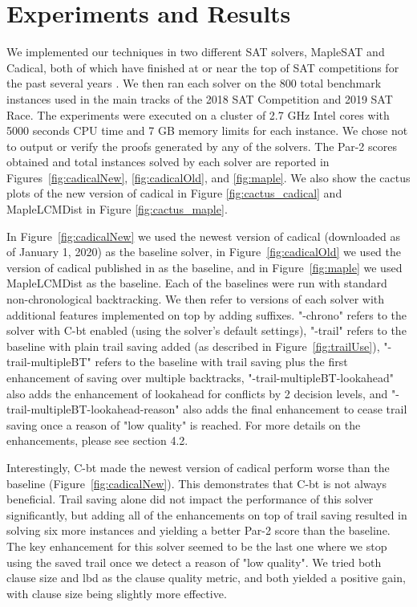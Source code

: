 \documentclass[runningheads]{llncs}
\newcommand{\cbt}{C-bt\xspace}
\begin{document}
\section{Experiments and Results}
We implemented our techniques in two different SAT solvers, MapleSAT
and Cadical, both of which have finished at or near the top of SAT
competitions for the past several years
\cite{Heule2018ProceedingsOS,Heule2019ProceedingsOS}. We then ran each
solver on the 800 total benchmark instances used in the main tracks of
the 2018 SAT Competition and 2019 SAT Race. The experiments were executed on a
cluster of 2.7 GHz Intel cores with 5000 seconds CPU time and 7 GB
memory limits for each instance. We chose not to output or verify the
proofs generated by any of the solvers. The Par-2 scores obtained and
total instances solved by each solver are reported in
Figures~\ref{fig:cadicalNew}, \ref{fig:cadicalOld}, and
\ref{fig:maple}. We also show the cactus plots of the new version of
cadical in Figure \ref{fig:cactus_cadical} and MapleLCMDist in Figure
\ref{fig:cactus_maple}.

In Figure~\ref{fig:cadicalNew} we used the newest version of cadical
(downloaded as of January 1, 2020) as the baseline solver, in
Figure~\ref{fig:cadicalOld} we used the version of cadical published
in \cite{DBLP:conf/sat/MohleB19} as the baseline, and in
Figure~\ref{fig:maple} we used MapleLCMDist \cite{DBLP:conf/ijcai/LuoLXML17,xiao2017maplelrb} as
the baseline. Each of the baselines were run with standard
non-chronological backtracking. We then refer to versions of each
solver with additional features implemented on top by adding
suffixes. "-chrono" refers to the solver with \cbt enabled (using the
solver's default settings), "-trail" refers to the baseline with plain
trail saving added (as described in Figure~\ref{fig:trailUse}),
"-trail-multipleBT" refers to the baseline with trail saving plus the
first enhancement of saving over multiple backtracks,
"-trail-multipleBT-lookahead" also adds the enhancement of lookahead
for conflicts by 2 decision levels, and
"-trail-multipleBT-lookahead-reason" also adds the final enhancement
to cease trail saving once a reason of "low quality" is reached. For
more details on the enhancements, please see section 4.2.

Interestingly, \cbt made the newest version of cadical perform worse
than the baseline (Figure~\ref{fig:cadicalNew}). This demonstrates
that \cbt is not always beneficial. Trail saving alone did not impact
the performance of this solver significantly, but adding all of the
enhancements on top of trail saving resulted in solving six more
instances and yielding a better Par-2 score than the baseline. The key
enhancement for this solver seemed to be the last one where we stop
using the saved trail once we detect a reason of "low quality". We
tried both clause size and lbd as the clause quality metric, and both
yielded a positive gain, with clause size being slightly more
effective.
\end{document}
